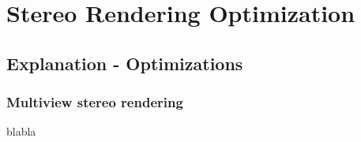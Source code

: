 
\chapter{Stereo Rendering Optimization}

\section{Explanation - Optimizations}
\subsection{Multiview stereo rendering}
blabla